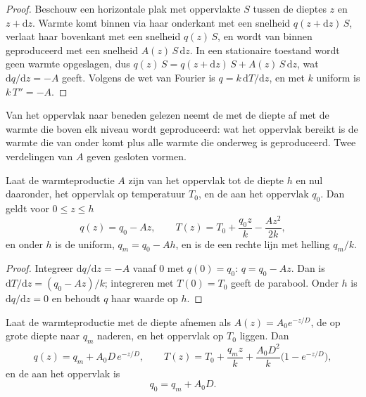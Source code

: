 \begin{proof}
Beschouw een horizontale plak met oppervlakte $S$ tussen de dieptes $z$ en $z +
\mathrm dz$. Warmte komt binnen via haar onderkant met een snelheid $q(z + \mathrm dz)\,S$, verlaat haar bovenkant met een snelheid $q(z)\,S$, en wordt van binnen geproduceerd met een snelheid $A(z)\,S\,\mathrm dz$. In een stationaire toestand wordt geen warmte opgeslagen, dus $q(z)\,S = q(z + \mathrm dz)\,S + A(z)\,S\,\mathrm dz$, wat $\mathrm dq/\mathrm dz = -A$ geeft. Volgens de wet van Fourier is $q = k\,\mathrm dT/\mathrm dz$, en met $k$ uniform is $k\,T'' = -A$.
\end{proof}

Van het oppervlak naar beneden gelezen neemt de  met de diepte af met de warmte die boven elk niveau wordt geproduceerd: wat het oppervlak bereikt is de warmte die van onder komt plus alle warmte die onderweg is geproduceerd. Twee verdelingen van $A$ geven gesloten vormen.

\begin{proposition}\label{prop:b1:heat-budget:uniform}
Laat de warmteproductie $A$ zijn van het oppervlak tot de diepte $h$ en nul daaronder, het oppervlak op temperatuur $T_0$, en de  aan het oppervlak $q_0$. Dan geldt voor $0 \le z \le h$
\[
  q(z) = q_0 - A z, \qquad T(z) = T_0 + \frac{q_0 z}{k} - \frac{A z^2}{2k},
\]
en onder $h$ is de  uniform, $q_m = q_0 - A h$, en is de  een rechte lijn met helling $q_m/k$.
\end{proposition}

\begin{proof}
Integreer $\mathrm dq/\mathrm dz = -A$ vanaf $0$ met $q(0) = q_0$: $q = q_0 -
Az$. Dan is $\mathrm dT/\mathrm dz = (q_0 - Az)/k$; integreren met $T(0) = T_0$
geeft de parabool. Onder $h$ is $\mathrm dq/\mathrm dz = 0$ en behoudt $q$ haar
waarde op $h$.
\end{proof}

\begin{theorem}
\label{thm:b1:heat-budget:exponential}
Laat de warmteproductie met de diepte afnemen als $A(z) = A_0 e^{-z/D}$, de  op grote diepte naar $q_m$ naderen, en het oppervlak op $T_0$ liggen. Dan
\[
  q(z) = q_m + A_0 D\,e^{-z/D}, \qquad
  T(z) = T_0 + \frac{q_m z}{k} + \frac{A_0 D^2}{k}\bigl(1 - e^{-z/D}\bigr),
\]
en de  aan het oppervlak is
\[
  q_0 = q_m + A_0 D .
\]
\end{theorem}

